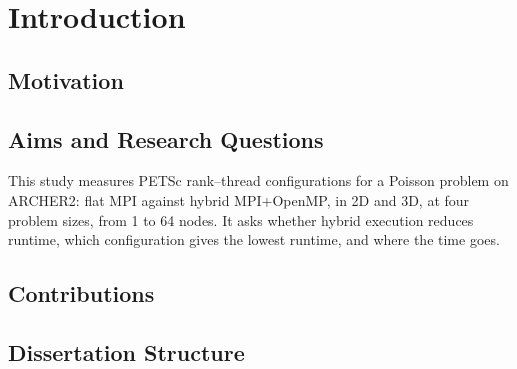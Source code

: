 \chapter{Introduction}
\label{ch:intro}

\section{Motivation}
\label{sec:motivation}

\section{Aims and Research Questions}
\label{sec:aims}
This study measures PETSc rank--thread configurations for a Poisson problem on ARCHER2:
flat MPI against hybrid MPI+OpenMP, in 2D and 3D, at four problem sizes, from 1 to 64
nodes. It asks whether hybrid execution reduces runtime, which configuration gives the
lowest runtime, and where the time goes.

\section{Contributions}
\label{sec:contributions}

\section{Dissertation Structure}
\label{sec:structure}
